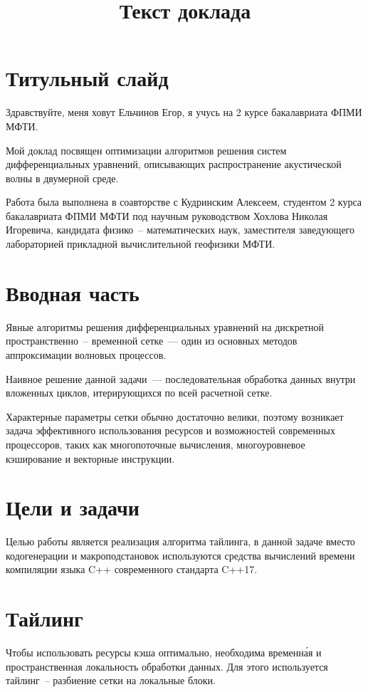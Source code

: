 \documentclass[18pt]{article}
\title{Текст доклада}
\begin{document}
\section{Титульный слайд}
\par
Здравствуйте, меня ховут Ельчинов Егор, я учусь на 2 курсе 
бакалавриата ФПМИ МФТИ.

Мой доклад посвящен оптимизации алгоритмов решения 
систем дифференциальных уравнений, описывающих распространение акустической
волны в двумерной среде.

Работа была выполнена в соавторстве с Кудринским Алексеем, студентом 2 курса
бакалавриата ФПМИ МФТИ под научным руководством Хохлова Николая Игоревича, 
кандидата физико~-- математических наук, заместителя заведующего 
лабораторией прикладной вычислительной геофизики МФТИ.

\section{Вводная часть}
\par
Явные алгоритмы решения дифференциальных уравнений на дискретной 
пространственно~-- временной сетке~--- один из основных методов
аппроксимации волновых процессов.

Наивное решение данной задачи~--- последовательная обработка 
данных внутри вложенных циклов, итерирующихся по всей расчетной сетке.

Характерные параметры сетки обычно достаточно велики, 
поэтому возникает задача эффективного использования 
ресурсов и возможностей современных процессоров, 
таких как многопоточные вычисления, многоуровневое кэширование и 
векторные инструкции.

\section{Цели и задачи}
\par
Целью работы является реализация алгоритма тайлинга, в данной задаче
вместо кодогенерации и макроподстановок используются средства вычислений
времени компиляции языка C++ современного стандарта C++17.

\section{Тайлинг}
\par
Чтобы использовать ресурсы кэша оптимально, необходима временн\'{а}я и 
пространственная локальность обработки данных.
Для этого используется тайлинг~-- разбиение сетки на локальные блоки.
\end{document}

